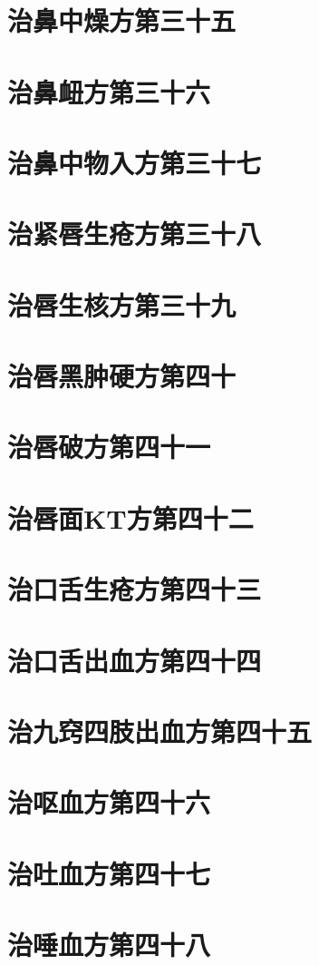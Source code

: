\documentclass[a4paper,12pt,UTF8,twoside]{ctexbook}
\begin{document}
\chapter{治鼻中燥方第三十五}
\chapter{治鼻衄方第三十六}
\chapter{治鼻中物入方第三十七}
\chapter{治紧唇生疮方第三十八}
\chapter{治唇生核方第三十九}
\chapter{治唇黑肿硬方第四十}
\chapter{治唇破方第四十一}
\chapter{治唇面KT方第四十二}
\chapter{治口舌生疮方第四十三}
\chapter{治口舌出血方第四十四}
\chapter{治九窍四肢出血方第四十五}
\chapter{治呕血方第四十六}
\chapter{治吐血方第四十七}
\chapter{治唾血方第四十八}
\end{document}
